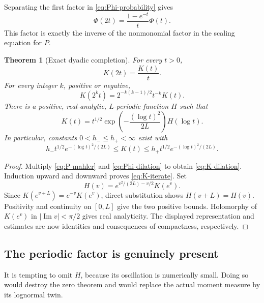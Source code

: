 \documentclass[11pt,a4paper]{article}
\numberwithin{equation}{section}
\newtheorem{theorem}{Theorem}[section]
\theoremstyle{definition}
\theoremstyle{remark}
\newcommand{\Ima}{\operatorname{Im}}
\newcommand{\abs}[1]{\left|#1\right|}
\begin{document}
Separating the first factor in \cref{eq:Phi-probability} gives
\begin{equation}
 \Phi(2t)=\frac{1-e^{-t}}{t}\Phi(t).
 \label{eq:Phi-dilation}
\end{equation}
This factor is exactly the inverse of the nonmonomial factor in the
scaling equation for $P$.

\begin{theorem}[Exact dyadic completion]
\label{thm:completion}
For every $t>0$,
\begin{equation}
 \boxed{K(2t)=\frac{K(t)}t.}
 \label{eq:K-dilation}
\end{equation}
For every integer $k$, positive or negative,
\begin{equation}
 K(2^kt)=2^{-k(k-1)/2}t^{-k}K(t).
 \label{eq:K-iterate}
\end{equation}
There is a positive, real-analytic, $L$-periodic function $H$ such that
\begin{equation}
 \boxed{K(t)=t^{1/2}
  \exp\left(-\frac{(\log t)^2}{2L}\right)H(\log t).}
 \label{eq:K-profile}
\end{equation}
In particular, constants $0<h_-\le h_+<\infty$ exist with
\begin{equation}
 h_-t^{1/2}e^{-(\log t)^2/(2L)}
 \le K(t)\le
 h_+t^{1/2}e^{-(\log t)^2/(2L)}.
 \label{eq:K-bounds}
\end{equation}
\end{theorem}
\begin{proof}
Multiply \cref{eq:P-mahler} and \cref{eq:Phi-dilation} to obtain
\cref{eq:K-dilation}. Induction upward and downward proves
\cref{eq:K-iterate}. Set
\[
 H(v)=e^{v^2/(2L)-v/2}K(e^v).
\]
Since $K(e^{v+L})=e^{-v}K(e^v)$, direct substitution shows
$H(v+L)=H(v)$. Positivity and continuity on $[0,L]$ give the two
positive bounds. Holomorphy of $K(e^v)$ in $\abs{\Ima v}<\pi/2$
gives real analyticity. The displayed representation and estimates
are now identities and consequences of compactness, respectively.
\end{proof}

\subsection{The periodic factor is genuinely present}
It is tempting to omit $H$, because its oscillation is numerically
small. Doing so would destroy the zero theorem and would replace the
actual moment measure by its lognormal twin.
\end{document}
